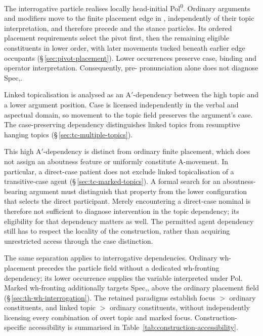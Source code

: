 The interrogative particle  realises locally head-initial
 Pol\textsuperscript{0}. Ordinary arguments and modifiers move to the
 finite placement edge in , independently of their topic
 interpretation, and therefore precede  and the stance particles.
 Its ordered placement requirements select the pivot first, then the remaining
 eligible constituents in lower order, with later movements tucked beneath
 earlier edge occupants (§\,\ref{sec:pivot-placement}). Lower occurrences
 preserve case, binding and operator interpretation. Consequently,
 pre- pronunciation alone does not diagnose Spec,.

Linked topicalisation is analysed as an A$'$-dependency between the high
 topic and a lower argument position. Case is licensed independently in the
 verbal and aspectual domain, so movement to the topic field preserves the
 argument's case. The case-preserving dependency distinguishes linked topics from resumptive
 hanging topics (§\,\ref{sec:tc-multiple-topics}).

This high A$'$-dependency is distinct from ordinary finite placement,
 which does not assign an aboutness feature or uniformly constitute A-movement. In particular, a direct-case
 patient does not exclude linked topicalisation of a transitive-case agent
 (§\,\ref{sec:tc-marked-topics}). A formal search for an aboutness-bearing
 argument must distinguish that property from the lower configuration that
 selects the direct participant. Merely encountering a direct-case nominal
 is therefore not sufficient to diagnose intervention in the topic dependency;
 its eligibility for that dependency matters as well. The permitted agent
 dependency still has to respect the locality of the construction, rather
 than acquiring unrestricted access through the case distinction.

The same separation applies to interrogative dependencies. Ordinary
 wh-placement precedes the particle field without a dedicated wh-fronting
 dependency; its lower occurrence supplies the variable interpreted under Pol.
 Marked wh-fronting additionally targets Spec,, above the
 ordinary placement field (§\,\ref{sec:th-wh-interrogation}). The retained
 paradigms establish focus $>$ ordinary constituents, and linked topic $>$
 ordinary constituents, without independently licensing every combination of
 overt topic and marked focus. Construction-specific accessibility is
 summarised in Table~\ref{tab:construction-accessibility}.

